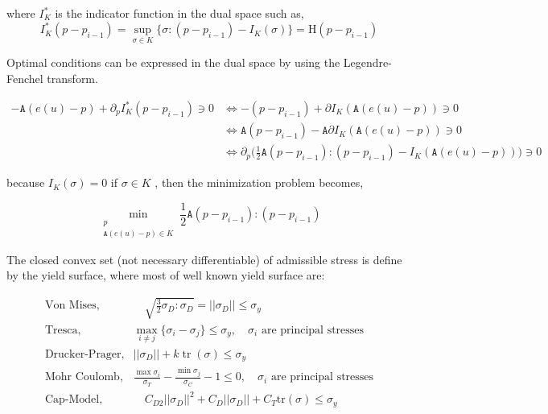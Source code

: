 \documentclass[10pt,oneside]{memoir}
\DeclareMathOperator{\tr}{tr}
\begin{document}
where $I^{*}_K$ is the indicator function in the dual space such as, $$I^*_K(p-p_{i-1})= \sup_{\sigma \in K} \{ \sigma:(p-p_{i-1}) - I_K(\sigma)  \} = \mathrm{H}(p-p_{i-1})$$


Optimal conditions can be expressed in the dual space by using the Legendre-Fenchel transform.


\begin{equation}
\begin{split}
-\mathtt{A} (e(u)-p) + \partial_p I^*_K(p-p_{i-1}) \ni 0 & \Leftrightarrow -(p-p_{i-1}) + \partial I_K(\mathtt{A} (e(u)-p)) \ni 0 \\
 & \Leftrightarrow   \mathtt{A}(p-p_{i-1}) - \mathtt{A}\partial I_K (\mathtt{A}(e(u)-p)) \ni 0 \\
& \Leftrightarrow  \partial_p \Big( \frac{1}{2}\mathtt{A}(p-p_{i-1}):(p-p_{i-1}) - I_K (\mathtt{A}(e(u)-p)) \Big) \ni 0
\end{split}
\end{equation}

because $I_K(\sigma) = 0$ if $\sigma \in K$ , then the minimization problem becomes,


$$ \min_{\substack{p \\ \mathtt{A}(e(u)-p) \in K}} \frac{1}{2}\mathtt{A} (p-p_{i-1}):(p-p_{i-1}) $$


The closed convex set (not necessary differentiable) of admissible stress is define by the yield surface, where most of well known yield surface are:

\begin{equation}
\begin{split}
\text{Von Mises},& \quad \sqrt{\frac{3}{2}\sigma_D:\sigma_D} = ||\sigma_D|| \leq \sigma_y  \\
\text{Tresca},& \max_{i\neq j} \{ \sigma_i - \sigma_j \} \leq \sigma _y ,\quad  \sigma_i \text{ are principal stresses}   \\
\text{Drucker-Prager},& ||\sigma_D || + k \tr(\sigma) \leq \sigma_y \\
\text{Mohr Coulomb},& \frac{\max{\sigma_i}}{\sigma_T} - \frac{\min{\sigma_j}}{\sigma_C} -1 \leq 0 ,\quad  \sigma_i \text{ are principal stresses}  \\
\text{Cap-Model},& \quad C_{D2} ||\sigma_D||^2 + C_D||\sigma_D|| + C_T \text{tr} (\sigma) \leq \sigma_y \\
\end{split}
\end{equation}
\end{document}
